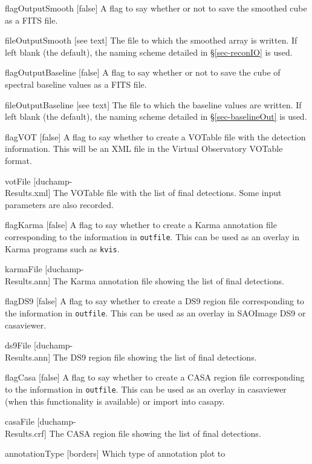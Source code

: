 \begin{Lentry}
\item[{flagOutputSmooth [false]}] A flag to say whether or not
  to save the smoothed cube as a FITS file. 
\item[fileOutputSmooth{ [see text]}] The file to which the smoothed array
  is written. If left blank (the default), the naming scheme detailed
  in \S\ref{sec-reconIO} is used.
\item[{flagOutputBaseline [false]}] A flag to say whether or not
  to save the cube of spectral baseline values as a FITS file. 
\item[fileOutputBaseline{ [see text]}] The file to which the baseline
  values are written. If left blank (the default), the naming scheme
  detailed in \S\ref{sec-baselineOut} is used.
\item[{flagVOT [false]}] A flag to say whether to create a
  VOTable file with the detection information. This will be an XML
  file in the Virtual Observatory VOTable format.
\item[{votFile [duchamp-\\Results.xml]}] The VOTable file with
  the list of final detections. Some input parameters are also
  recorded. 
\item[{flagKarma [false]}] A flag to say whether to create a
  Karma annotation file corresponding to the information in
  \texttt{outfile}. This can be used as an overlay in Karma
  programs such as \texttt{kvis}.
\item[{karmaFile [duchamp-\\Results.ann]}] The Karma annotation
  file showing the list of final detections.
\item[{flagDS9 [false]}] A flag to say whether to create a
  DS9 region file corresponding to the information in
  \texttt{outfile}. This can be used as an overlay in SAOImage DS9 or
  casaviewer. 
\item[{ds9File [duchamp-\\Results.ann]}] The DS9 region file showing
  the list of final detections.
\item[{flagCasa [false]}] A flag to say whether to create a
  CASA region file corresponding to the information in
  \texttt{outfile}. This can be used as an overlay in casaviewer (when
  this functionality is available) or import into casapy. 
\item[{casaFile [duchamp-\\Results.crf]}] The CASA region file showing
  the list of final detections.
\item[{annotationType [borders]}] Which type of annotation plot to

\end{Lentry}
